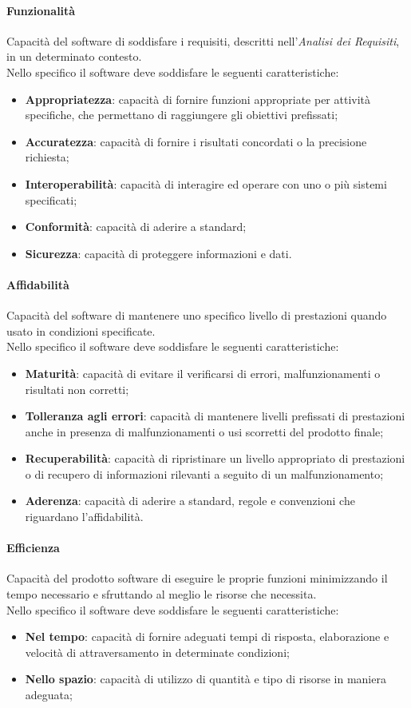 		\paragraph{Funzionalità}
		Capacità del software di soddisfare i requisiti, descritti nell'\textit{Analisi dei Requisiti}, in un determinato contesto.\\
		Nello specifico il software deve soddisfare le seguenti caratteristiche:
		\begin{itemize}
			\item \textbf{Appropriatezza}: capacità di fornire funzioni appropriate per attività specifiche, che permettano di raggiungere gli obiettivi prefissati;
			\item \textbf{Accuratezza}: capacità di fornire i risultati concordati o la precisione richiesta;
			\item \textbf{Interoperabilità}: capacità di interagire ed operare con uno o più sistemi specificati;
			\item \textbf{Conformità}: capacità di aderire a standard;
			\item \textbf{Sicurezza}: capacità di proteggere informazioni e dati.
		\end{itemize}
		\paragraph{Affidabilità}
		Capacità del software di mantenere uno specifico livello di prestazioni quando usato in condizioni specificate.\\
		Nello specifico il software deve soddisfare le seguenti caratteristiche:
		\begin{itemize}
			\item \textbf{Maturità}: capacità di evitare il verificarsi di errori, malfunzionamenti o risultati non corretti;
			\item \textbf{Tolleranza agli errori}: capacità di mantenere livelli prefissati di prestazioni anche in presenza di malfunzionamenti o usi scorretti del prodotto finale;
			\item \textbf{Recuperabilità}: capacità di ripristinare un livello appropriato di prestazioni o di recupero di informazioni rilevanti a seguito di un malfunzionamento;
			\item \textbf{Aderenza}: capacità di aderire a standard, regole e convenzioni che riguardano l'affidabilità.
		\end{itemize}
		\paragraph{Efficienza}
		Capacità del prodotto software di eseguire le proprie funzioni minimizzando il tempo necessario e sfruttando al meglio le risorse che necessita.\\
		Nello specifico il software deve soddisfare le seguenti caratteristiche:
		\begin{itemize}
			\item \textbf{Nel tempo}: capacità di fornire adeguati tempi di risposta, elaborazione e velocità di attraversamento in determinate condizioni;
			\item \textbf{Nello spazio}: capacità di utilizzo di quantità e tipo di risorse in maniera adeguata;
		\end{itemize}
